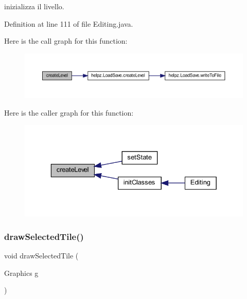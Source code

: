 inizializza il livello. 



Definition at line 111 of file Editing.\+java.

Here is the call graph for this function\+:
\nopagebreak
\begin{figure}[H]
\begin{center}
\leavevmode
\includegraphics[width=350pt]{classscenes_1_1_editing_ad79f312dd3a9e52f38a9e5f1536537fd_cgraph}
\end{center}
\end{figure}
Here is the caller graph for this function\+:\nopagebreak
\begin{figure}[H]
\begin{center}
\leavevmode
\includegraphics[width=329pt]{classscenes_1_1_editing_ad79f312dd3a9e52f38a9e5f1536537fd_icgraph}
\end{center}
\end{figure}
\mbox{\label{classscenes_1_1_editing_aa0f35d91a41dfb53af7bdd7d4a76916f}} 
\subsubsection{\texorpdfstring{draw\+Selected\+Tile()}{drawSelectedTile()}}
{\footnotesize\ttfamily void draw\+Selected\+Tile (\begin{DoxyParamCaption}\item[{Graphics}]{g }\end{DoxyParamCaption})}



